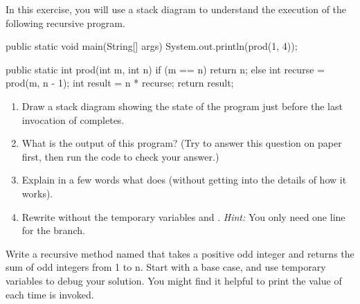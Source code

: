 \begin{exercise}  %

In this exercise, you will use a stack diagram to understand the execution of the following recursive program.

\begin{code}
public static void main(String[] args) {
    System.out.println(prod(1, 4));
}

public static int prod(int m, int n) {
    if (m == n) {
        return n;
    } else {
        int recurse = prod(m, n - 1);
        int result = n * recurse;
        return result;
    }
}
\end{code}

\begin{enumerate}

\item Draw a stack diagram showing the state of the program just before the last invocation of  completes.

\item What is the output of this program?
(Try to answer this question on paper first, then run the code to check your answer.)

\item Explain in a few words what  does (without getting into the details of how it works).

\item Rewrite  without the temporary variables  and .
{\it Hint:} You only need one line for the  branch.

\end{enumerate}

\end{exercise}


\begin{exercise}  %

Write a recursive method named  that takes a positive odd integer  and returns the sum of odd integers from 1 to n.
Start with a base case, and use temporary variables to debug your solution.
You might find it helpful to print the value of  each time  is invoked.

\end{exercise}



